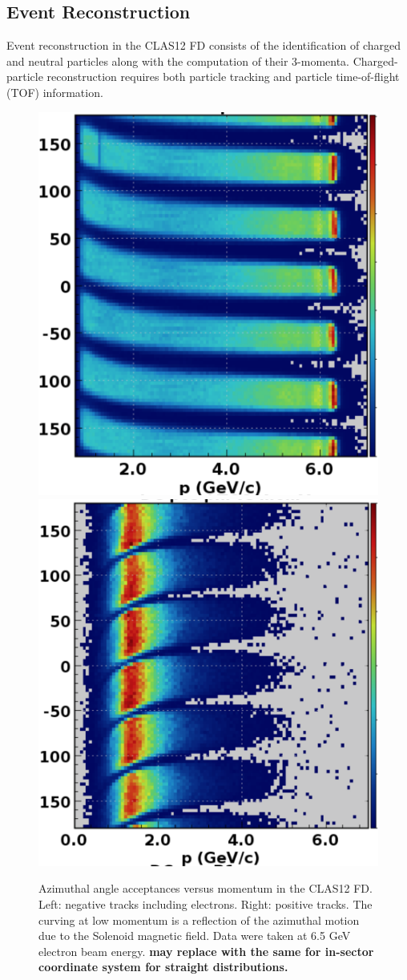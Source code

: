 \documentclass[final,3p,twocolumn]{elsarticle}
\begin{document}
\subsection{\rm Event Reconstruction} 
Event reconstruction in the CLAS12 FD consists of the identification of charged and neutral particles along with the 
computation of their 3-momenta. Charged-particle reconstruction requires both particle tracking and particle 
time-of-flight (TOF) information. 
\begin{figure}[htbp!]
\centerline {
\includegraphics[width=0.5\columnwidth]{neg-tracks.png}
\includegraphics[width=0.52\columnwidth]{pos-tracks.png}}
\caption{Azimuthal angle acceptances versus momentum in the CLAS12 FD. Left: negative tracks including electrons. Right: positive tracks. The curving at low momentum is a reflection of the azimuthal motion due to the Solenoid magnetic field. Data were taken at 6.5 GeV electron beam energy. {\bf may replace with the same for in-sector coordinate system for straight distributions. } } 
\label{neg-pos}
\end{figure}
\end{document}
